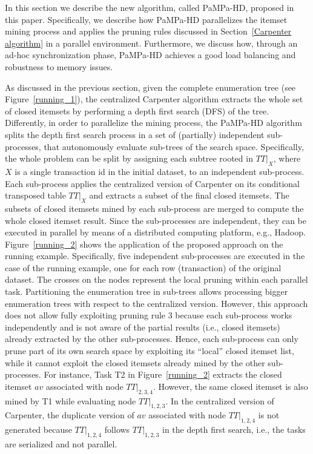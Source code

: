 In this section we describe the new algorithm, called PaMPa-HD, proposed in this paper. Specifically, 
we describe how PaMPa-HD parallelizes the itemset mining
process and applies the pruning rules discussed in Section~\ref{Carpenter algorithm} in a parallel 
environment.
Furthermore, we discuss how, through an ad-hoc
synchronization phase, PaMPa-HD achieves a good load balancing
and robustness to memory issues.

As discussed in the previous section, given the complete enumeration tree (see Figure~\ref{running_1}), the
centralized Carpenter algorithm
extracts the whole set of closed itemsets by performing a depth first search
(DFS) of the tree.
Differently, in order to parallelize the mining process, the PaMPa-HD algorithm splits the depth
first search process in a set of (partially) independent
sub-processes, that autonomously evaluate sub-trees of the search space.
Specifically, the whole problem can be split by assigning
each subtree rooted in $TT|_{X}$, where $X$ is a single transaction id in the
initial dataset, to an independent sub-process.
Each sub-process applies the centralized version of Carpenter on its conditional
transposed table $TT|_{X}$ and extracts a subset of the final closed itemsets.
The subsets of closed itemsets mined by each sub-process
are merged to compute the whole closed itemset result.
Since the sub-processes are independent, they can be executed in parallel by
means of a distributed computing platform, e.g., Hadoop.
Figure~\ref{running_2} shows the application of the proposed approach on the
running example.
Specifically, five independent sub-processes are executed in the case of the
running example, one for each row (transaction) of the original dataset.
The crosses on the nodes represent the local pruning within each parallel task.
Partitioning the enumeration tree in sub-trees allows processing bigger
enumeration trees with respect to the centralized version. However, this
approach does not allow fully exploiting pruning rule 3
because each sub-process works independently and is not aware of the partial
results (i.e., closed itemsets) already extracted by the other sub-processes.
Hence, each sub-process can only prune part of its own search space by
exploiting its ``local'' closed itemset list, while
it cannot exploit the closed itemsets already mined by the other sub-processes.
For instance, Task T2 in Figure~\ref{running_2} extracts the closed itemset $av$
associated with node $TT|_{2, 3, 4}$.
However, the same closed itemset is also mined by T1 while evaluating node
$TT|_{1, 2, 3}$.
In the centralized version of Carpenter, the duplicate version of $av$
associated with node $TT|_{1, 2, 4}$ is not generated because $TT|_{1, 2, 4}$
follows
$TT|_{1, 2, 3}$ in the depth first search, i.e., the tasks are serialized and
not parallel.

